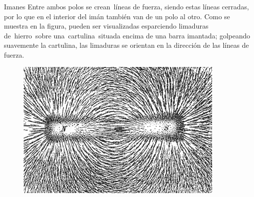 \begin{myblock}{Imanes}
\vspace{2mm} Entre ambos polos se crean líneas de fuerza, siendo estas líneas cerradas, por lo que en el interior del imán también van de un polo al otro. Como se muestra en la figura, pueden ser visualizadas esparciendo limaduras de hierro sobre una cartulina situada encima de una barra imantada; golpeando suavemente la cartulina, las limaduras se orientan en la dirección de las líneas de fuerza.

\begin{figure}[H]
	\centering
	\includegraphics[width=0.9\textwidth]{imagenes/imagenes27/T27IM11.png}
\end{figure}

\end{myblock}

